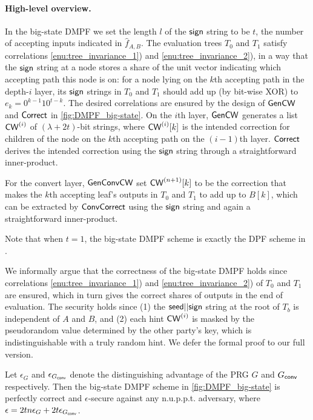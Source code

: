 \paragraph{High-level overview.}In the big-state DMPF we set the length $l$ of the ${\sf sign}$ string to be $t$, the number of accepting inputs indicated in $\hat{f}_{A,B}$. The evaluation trees $T_0$ and $T_1$ satisfy correlations \ref{enu:tree_invariance_1}) and \ref{enu:tree_invariance_2}), in a way that the ${\sf sign}$ string at a node stores a share of the unit vector indicating which accepting path this node is on: for a node lying on the $k$th accepting path in the depth-$i$ layer, its ${\sf sign}$ strings in $T_0$ and $T_1$ should add up (by bit-wise XOR) to $e_k = 0^{k-1}10^{t-k}$. The desired correlations are ensured by the design of ${\sf Gen}{\sf CW}$ and ${\sf Correct}$ in \cref{fig:DMPF_big-state}. On the $i$th layer, ${\sf Gen}{\sf CW}$ generates a list ${\sf CW}^{(i)}$ of $(\lambda+2t)$-bit strings, where ${\sf CW}^{(i)}[k]$ is the intended correction for children of the node on the $k$th accepting path on the $(i-1)$th layer. 
${\sf Correct}$ derives the intended correction using the ${\sf sign}$ string through a straightforward inner-product.

For the convert layer, $\sf GenConvCW$ set ${\sf CW}^{(n+1)}[k]$ to be the correction that makes the $k$th accepting leaf's outputs in $T_0$ and $T_1$ to add up to $B[k]$, which can be extracted by ${\sf Conv}{\sf Correct}$ using the ${\sf sign}$ string and again a straightforward inner-product.  



\begin{remark}
  Note that when $t=1$, the big-state DMPF scheme is exactly the DPF scheme in \cite{BoyGilIsh16}. 
\end{remark}

We informally argue that the correctness of the big-state DMPF holds since correlations \ref{enu:tree_invariance_1}) and \ref{enu:tree_invariance_2}) of $T_0$ and $T_1$ are ensured, which in turn gives the correct shares of outputs in the end of evaluation. The security holds since (1) the ${\sf seed}||{\sf sign}$ string at the root of $T_b$ is independent of $A$ and $B$, and (2) each hint ${\sf CW}^{(i)}$ is masked by the pseudorandom value determined by the other party's key, which is indistinguishable with a truly random hint. We defer the formal proof to our full version. 

\begin{theorem}
    Let $\epsilon_G$ and $\epsilon_{G_{\sf conv}}$ denote the distinguishing advantage of the PRG $G$ and $G_{\sf conv}$ respectively. Then the big-state DMPF scheme in \cref{fig:DMPF_big-state} is perfectly correct and $\epsilon$-secure against any n.u.p.p.t. adversary, where $\epsilon = 2tn\epsilon_G+2t\epsilon_{G_{\sf conv}}$. 
\end{theorem}

